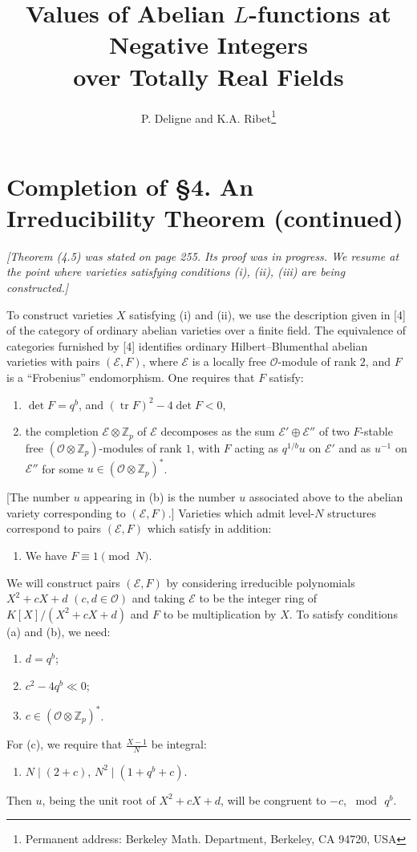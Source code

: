 \documentclass[12pt,a4paper]{article}
\title{Values of Abelian $L$-functions at Negative Integers\\over Totally Real Fields}
\author{P. Deligne and K.A. Ribet\footnote{Permanent address: Berkeley Math. Department, Berkeley, CA 94720, USA}}
\date{}
\theoremstyle{plain}
\theoremstyle{definition}
\theoremstyle{remark}
\DeclareMathOperator{\tr}{tr}
\begin{document}

\section*{Completion of \S 4. An Irreducibility Theorem (continued)}

\textit{[Theorem \textup{(4.5)} was stated on page \textup{255}. Its proof was in progress. We resume at the point where varieties satisfying conditions (i), (ii), (iii) are being constructed.]}

To construct varieties $X$ satisfying (i) and (ii), we use the description given in [4] of the category of ordinary abelian varieties over a finite field. The equivalence of categories furnished by [4] identifies ordinary Hilbert--Blumenthal abelian varieties with pairs $(\mathscr{E}, F)$, where $\mathscr{E}$ is a locally free $\mathcal{O}$-module of rank $2$, and $F$ is a ``Frobenius'' endomorphism. One requires that $F$ satisfy:
\begin{enumerate}[label=(\alph*)]
\item $\det F = q^b$, and $(\tr F)^2 - 4\det F < 0$,
\item the completion $\mathscr{E} \otimes \mathbb{Z}_p$ of $\mathscr{E}$ decomposes as the sum $\mathscr{E}' \oplus \mathscr{E}''$ of two $F$-stable free $(\mathcal{O} \otimes \mathbb{Z}_p)$-modules of rank $1$, with $F$ acting as $q^{1/b}u$ on $\mathscr{E}'$ and as $u^{-1}$ on $\mathscr{E}''$ for some $u \in (\mathcal{O} \otimes \mathbb{Z}_p)^*$.
\end{enumerate}
[The number $u$ appearing in (b) is the number $u$ associated above to the abelian variety corresponding to $(\mathscr{E}, F)$.] Varieties which admit level-$N$ structures correspond to pairs $(\mathscr{E}, F)$ which satisfy in addition:
\begin{enumerate}[label=(\alph*), resume]
\item We have $F \equiv 1 \pmod{N}$.
\end{enumerate}
We will construct pairs $(\mathscr{E}, F)$ by considering irreducible polynomials $X^2 + cX + d$ $(c, d \in \mathcal{O})$ and taking $\mathscr{E}$ to be the integer ring of $K[X]/(X^2 + cX + d)$ and $F$ to be multiplication by $X$. To satisfy conditions (a) and (b), we need:
\begin{enumerate}[label=(\arabic*)]
\item $d = q^b$;
\item $c^2 - 4q^b \ll 0$;
\item $c \in (\mathcal{O} \otimes \mathbb{Z}_p)^*$.
\end{enumerate}
For (c), we require that $\frac{X-1}{N}$ be integral:
\begin{enumerate}[label=(\arabic*), resume]
\item $N \mid (2 + c)$, $N^2 \mid (1 + q^b + c)$.
\end{enumerate}
Then $u$, being the unit root of $X^2 + cX + d$, will be congruent to $-c$, $\bmod\, q^b$.
\end{document}

